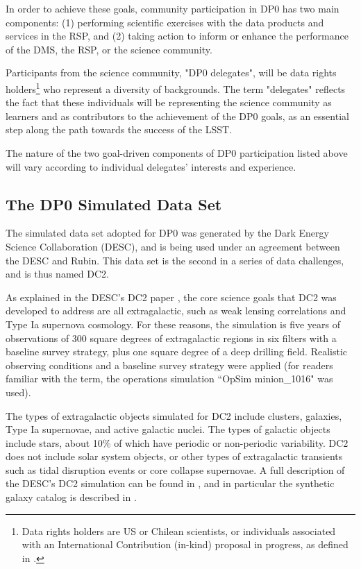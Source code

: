 \documentclass[DM,lsstdraft,authoryear,toc]{lsstdoc}
\begin{document}
In order to achieve these goals, community participation in DP0 has two main components:
(1) performing scientific exercises with the data products and services in the RSP, and
(2) taking action to inform or enhance the performance of the DMS, the RSP, or the science community.

Participants from the science community, "DP0 delegates", will be data rights holders\footnote{Data rights holders are US or Chilean scientists, or individuals associated with an International Contribution (in-kind) proposal in progress, as defined in .} who represent a diversity of backgrounds.
The term "delegates" reflects the fact that these individuals will be representing the science community as learners and as contributors to the achievement of the DP0 goals, as an essential step along the path towards the success of the LSST. 

The nature of the two goal-driven components of DP0 participation listed above will vary according to individual delegates' interests and experience.

\subsection{The DP0 Simulated Data Set}\label{ssec:intro_dc2}

The simulated data set adopted for DP0 was generated by the Dark Energy Science Collaboration (DESC), and is being used under an agreement between the DESC and Rubin.
This data set is the second in a series of data challenges, and is thus named DC2.

As explained in the DESC's DC2 paper \citep{2020arXiv201005926L}, the core science goals that DC2 was developed to address are all extragalactic, such as weak lensing correlations and Type Ia supernova cosmology.
For these reasons, the simulation is five years of observations of 300 square degrees of extragalactic regions in six filters with a baseline survey strategy, plus one square degree of a deep drilling field.
Realistic observing conditions and a baseline survey strategy were applied (for readers familiar with the term, the operations simulation ``OpSim minion\_1016" was used).

The types of extragalactic objects simulated for DC2 include clusters, galaxies, Type Ia supernovae, and active galactic nuclei.
The types of galactic objects include stars, about 10\% of which have periodic or non-periodic variability.
DC2 does not include solar system objects, or other types of extragalactic transients such as tidal disruption events or core collapse supernovae.
A full description of the DESC's DC2 simulation can be found in \citep{2020arXiv201005926L}, and in particular the synthetic galaxy catalog is described in \citet{2019ApJS..245...26K}.
\end{document}
